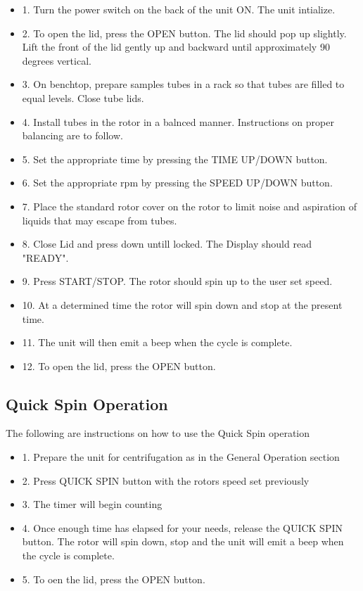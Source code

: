 \documentclass[12pt]{../SOP3_beta}
\begin{document}
\begin{itemize}
  \item 1. Turn the power switch on the back of the unit ON. The unit intialize.
  \item 2. To open the lid, press the OPEN button. The lid should pop up slightly. Lift the front of the lid gently up and backward until approximately 90 degrees vertical.
  \item 3. On benchtop, prepare samples tubes in a rack so that tubes are filled to equal levels. Close tube lids.
  \item 4. Install tubes in the rotor in a balnced manner. Instructions on proper balancing are to follow.
  \item 5. Set the appropriate time by pressing the TIME UP/DOWN button.
  \item 6. Set the appropriate rpm by pressing the SPEED UP/DOWN button.
  \item 7. Place the standard rotor cover on the rotor to limit noise and aspiration of liquids that may escape from tubes.
  \item 8. Close Lid and press down untill locked. The Display should read "READY".
  \item 9. Press START/STOP. The rotor should spin up to the user set speed.
  \item 10. At a determined time the rotor will spin down and stop at the present time.
  \item 11. The unit will then emit a beep when the cycle is complete.
  \item 12. To open the lid, press the OPEN button.
\end{itemize}

\subsection*{Quick Spin Operation}

\NP The following are instructions on how to use the Quick Spin operation

\begin{itemize}
  \item 1. Prepare the unit for centrifugation as in the General Operation section
  \item 2. Press QUICK SPIN button with the rotors speed set previously
  \item 3. The timer will begin counting
  \item 4. Once enough time has elapsed for your needs, release the QUICK SPIN button. The rotor will spin down, stop and the unit will emit a beep when the cycle is complete.
  \item 5. To oen the lid, press the OPEN button.
\end{itemize}
\end{document}
